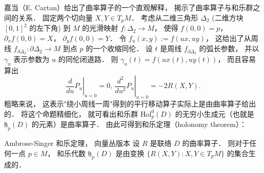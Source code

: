 嘉当（E. Cartan）给出了曲率算子的一个直观解释， 揭示了曲率算子与和乐群之间的关系． 固定两个切向量 $X,Y\in T_pM$． 考虑从二维三角形 $\Delta_2$ (二维方块 $[0,1]^2$ 的左下角) 到 $M$ 的光滑映射 $f:\Delta_2\to M$， 使得 $f(0,0)=p$， $\partial_xf(0,0)=X$， $\partial_yf(0,0)=Y$． 令 $f_u(x,y):=f(ux,uy)$， 这给出了从周线 $f_{\partial\Delta_2}:\partial\Delta_2\to M$ 到点 $p$ 的一个收缩同伦． 设 $t$ 是周线 $f_{\partial\Delta_2}$ 的弧长参数， 并以 $\gamma_u$ 表示参数为 $u$ 的同伦闭道路． 则 $\gamma_u(t)=f(ux(t),uy(t))$， 而且容易算出
$$
\left.\frac{d}{du}P_u\right|_{u=0}=0,\,\left.\frac{d^2}{du^2}P_u\right|_{u=0}=-2R(X,Y).
$$
粗略来说， 这表示"绕小周线一周"得到的平行移动算子实际上是由曲率算子给出的． 将这个命题精细化， 就可看出和乐群 $\text{Hol}_p^0(D)$ 的无穷小生成元（也就是 $\mathfrak{h}_p(D)$ 的元素）是曲率算子． 由此可得到和乐定理（holonomy theorem）：

\begin{theorem}{Ambrose-Singer 和乐定理， 向量丛版本}
设 $R$ 是联络 $D$ 的曲率算子． 则对于任何一点 $p\in M$， 和乐代数 $\mathfrak{h}_p(D)$ 是由变换 $\{R(X,Y):X,Y\in T_pM\}$ 的集合生成的．
\end{theorem}
